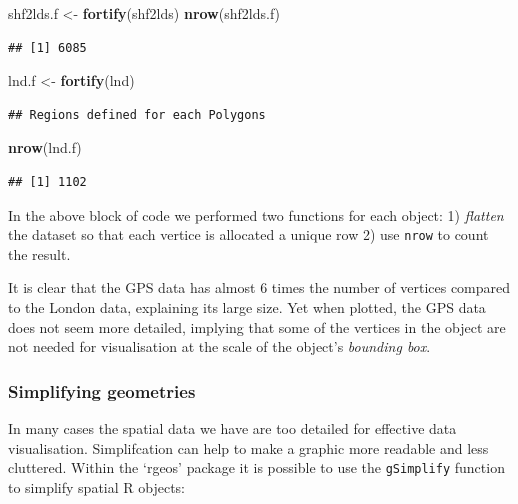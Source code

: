 \documentclass[]{article}
\newenvironment{Shaded}{}{}
\newcommand{\KeywordTok}[1]{\textcolor[rgb]{0.00,0.44,0.13}{\textbf{{#1}}}}
\newcommand{\NormalTok}[1]{{#1}}
\begin{document}
\begin{Shaded}
\begin{Highlighting}[]
\NormalTok{shf2lds.f <- }\KeywordTok{fortify}\NormalTok{(shf2lds)}
\KeywordTok{nrow}\NormalTok{(shf2lds.f)}
\end{Highlighting}
\end{Shaded}
\begin{verbatim}
## [1] 6085
\end{verbatim}
\begin{Shaded}
\begin{Highlighting}[]

\NormalTok{lnd.f <- }\KeywordTok{fortify}\NormalTok{(lnd)}
\end{Highlighting}
\end{Shaded}
\begin{verbatim}
## Regions defined for each Polygons
\end{verbatim}
\begin{Shaded}
\begin{Highlighting}[]
\KeywordTok{nrow}\NormalTok{(lnd.f)}
\end{Highlighting}
\end{Shaded}
\begin{verbatim}
## [1] 1102
\end{verbatim}
In the above block of code we performed two functions for each object:
1) \emph{flatten} the dataset so that each vertice is allocated a unique
row 2) use \texttt{nrow} to count the result.

It is clear that the GPS data has almost 6 times the number of vertices
compared to the London data, explaining its large size. Yet when
plotted, the GPS data does not seem more detailed, implying that some of
the vertices in the object are not needed for visualisation at the scale
of the object's \emph{bounding box}.

\subsubsection{Simplifying geometries}

In many cases the spatial data we have are too detailed for effective
data visualisation. Simplifcation can help to make a graphic more
readable and less cluttered. Within the `rgeos' package it is possible
to use the \texttt{gSimplify} function to simplify spatial R objects:
\end{document}
